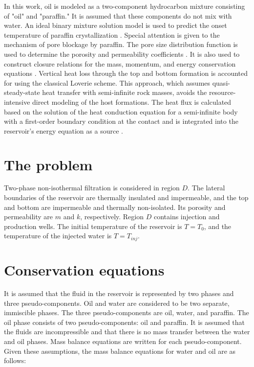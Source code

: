 \documentclass[
11pt,%
tightenlines,%
twoside,%
onecolumn,%
nofloats,%
nobibnotes,%
nofootinbib,%
superscriptaddress,%
noshowpacs,%
centertags]%
{revtex4-2}
\begin{document}
	In this work, oil is modeled as a two-component hydrocarbon mixture consisting of "oil" and "paraffin." It is assumed that these components do not mix with water. An ideal binary mixture solution model is used to predict the onset temperature of paraffin crystallization \cite{8}. Special attention is given to the mechanism of pore blockage by paraffin. The pore size distribution function is used to determine the porosity and permeability coefficients \cite{4}. It is also used to construct closure relations for the mass, momentum, and energy conservation equations \cite{4, 11, 12}. Vertical heat loss through the top and bottom formation is accounted for using the classical Loverie scheme. This approach, which assumes quasi-steady-state heat transfer with semi-infinite rock masses, avoids the resource-intensive direct modeling of the host formations. The heat flux is calculated based on the solution of the heat conduction equation for a semi-infinite body with a first-order boundary condition at the contact and is integrated into the reservoir's energy equation as a source \cite{13}.


\section{The problem}
	Two-phase non-isothermal filtration is considered in region $D$. The lateral boundaries of the reservoir are thermally insulated and impermeable, and the top and bottom are impermeable and thermally non-isolated. Its porosity and permeability are $m$ and $k$, respectively. Region $D$ contains injection and production wells. The initial temperature of the reservoir is $T=T_0$, and the temperature of the injected water is $T=T_{inj}$.
	
	
\section{Conservation equations}
	It is assumed that the fluid in the reservoir is represented by two phases and three pseudo-components. Oil and water are considered to be two separate, immiscible phases. The three pseudo-components are oil, water, and paraffin. The oil phase consists of two pseudo-components: oil and paraffin. It is assumed that the fluids are incompressible and that there is no mass transfer between the water and oil phases. Mass balance equations are written for each pseudo-component. Given these assumptions, the mass balance equations for water and oil are as follows:
\end{document}

